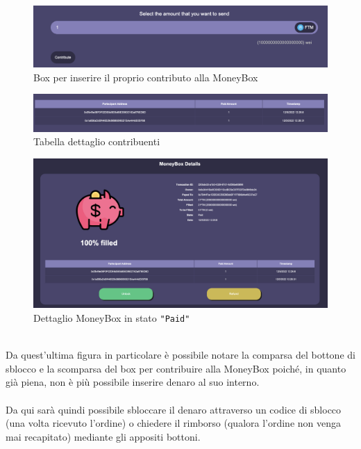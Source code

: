             \begin{figure}[H]
                \centering
                \includegraphics[scale=0.3]{immagini/Checkout/Contribute.png} 
                \caption{Box per inserire il proprio contributo alla MoneyBox}
            \end{figure}
            \begin{figure}[H]
                \centering
                \includegraphics[scale=0.25]{immagini/Checkout/ContributionsTable.png} 
                \caption{Tabella dettaglio contribuenti}
            \end{figure}
            \begin{figure}[H]
                \centering
                \includegraphics[scale=0.2]{immagini/Checkout/FilledMoneyBox.png} 
                \caption{Dettaglio MoneyBox in stato \texttt{"Paid"}}
            \end{figure}
            \textbf{}\\
            Da quest'ultima figura in particolare è possibile notare la comparsa del bottone di sblocco e la scomparsa del box per contribuire alla MoneyBox poiché, in quanto già piena, non è più possibile inserire denaro al suo interno.\\\\
            Da qui sarà quindi possibile sbloccare il denaro attraverso un codice di sblocco (una volta ricevuto l'ordine) o chiedere il rimborso (qualora l'ordine non venga mai recapitato) mediante gli appositi bottoni.
